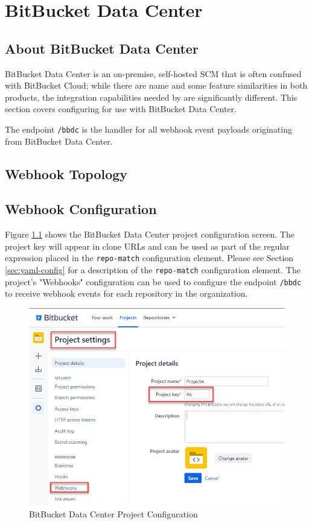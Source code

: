 \chapter{BitBucket Data Center}

\section{About BitBucket Data Center}

BitBucket Data Center is an on-premise, self-hosted SCM that is often confused with BitBucket Cloud; while there are name and some
feature similarities in both products, the integration capabilities needed by \cxoneflow
are significantly different.  This section covers configuring \cxoneflow for use with BitBucket Data Center.

The \cxoneflow endpoint \texttt{/bbdc} is the handler for all webhook event
payloads originating from BitBucket Data Center.  

\section{Webhook Topology}



\section{Webhook Configuration}

Figure \ref{fig:bbdc-project-config} shows the BitBucket Data Center project configuration screen.  The
project key will appear in clone URLs and can be used as part of the regular expression 
placed in the \texttt{repo-match} configuration element.  Please see Section \ref{sec:yaml-config} 
for a description of the \texttt{repo-match} configuration element. The project's "Webhooks" configuration
can be used to configure the \cxoneflow endpoint \texttt{/bbdc} to receive webhook events for each repository in the organization.  

\begin{figure}[ht]
    \includegraphics[width=\textwidth]{graphics/bbdc-project-config.png}
    \caption{BitBucket Data Center Project Configuration}
    \label{fig:bbdc-project-config}
\end{figure}


